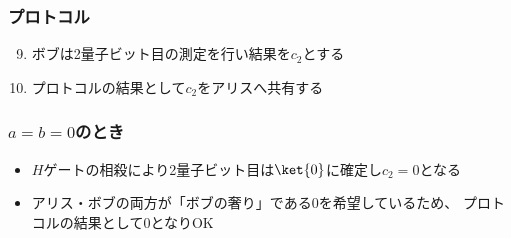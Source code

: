 \begin{frame}
  \frametitle{プロトコル}

  \begin{enumerate}
    \setcounter{enumi}{8}

    \item<+-> ボブは2量子ビット目の測定を行い結果を$c_2$とする
    \begin{figure}
    \end{figure}
    
    \item<+-> プロトコルの結果として$c_2$をアリスへ共有する
  \end{enumerate}

  \pause
\end{frame}

\begin{frame}
  \frametitle{ $a = b = 0$のとき}

  \begin{figure}
  \end{figure}

  \begin{itemize}
    \item<+-> $H$ゲートの相殺により2量子ビット目は$\ket{0}$に確定し$c_2 = 0$となる
    
    \item<+-> アリス・ボブの両方が「ボブの奢り」である$0$を希望しているため、
    プロトコルの結果として$0$となりOK
  \end{itemize}
\end{frame}

